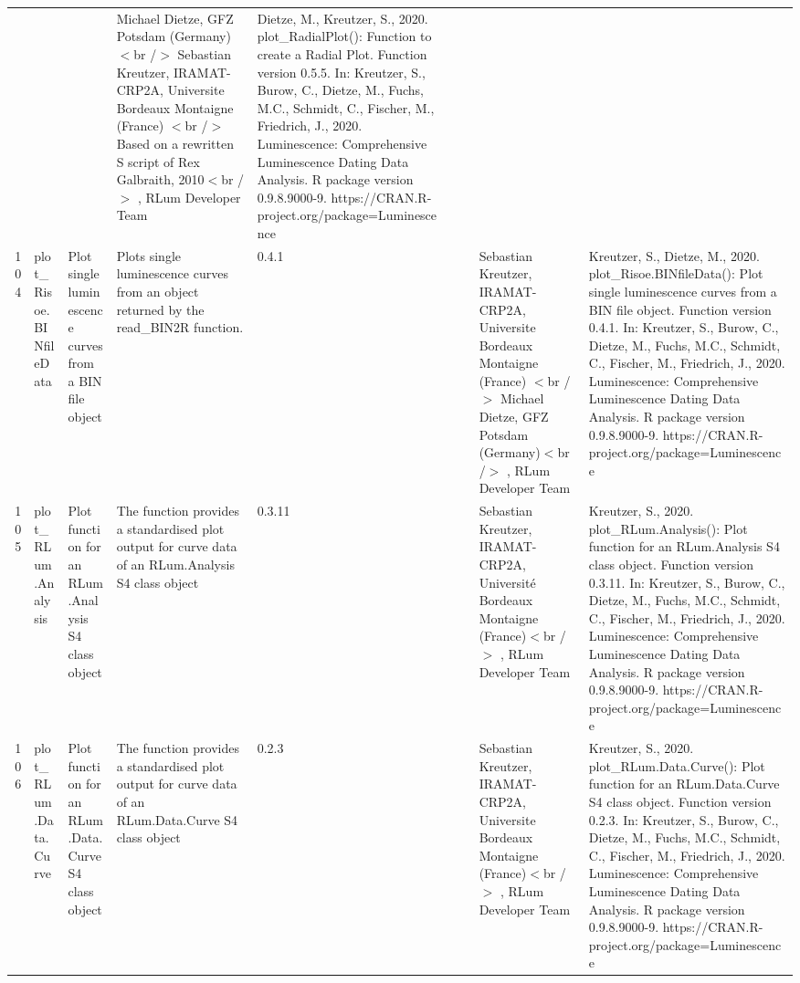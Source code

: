 \begin{table}[ht]
\begin{tabular}{rllllllll}
 &  &  & Michael Dietze, GFZ Potsdam (Germany) $<$br /$>$ Sebastian Kreutzer, IRAMAT-CRP2A, Universite Bordeaux Montaigne (France) $<$br /$>$ Based on a rewritten S script of Rex Galbraith, 2010$<$br /$>$ , RLum Developer Team & Dietze, M., Kreutzer, S., 2020. plot\_RadialPlot(): Function to create a Radial Plot. Function version 0.5.5. In: Kreutzer, S., Burow, C., Dietze, M., Fuchs, M.C., Schmidt, C., Fischer, M., Friedrich, J., 2020. Luminescence: Comprehensive Luminescence Dating Data Analysis. R package version 0.9.8.9000-9. https://CRAN.R-project.org/package=Luminescence
 \\ 
  104 & plot\_Risoe.BINfileData & Plot single luminescence curves from a BIN file object & Plots single luminescence curves from an object returned by the read\_BIN2R  function. & 0.4.1
 &  &  & Sebastian Kreutzer, IRAMAT-CRP2A, Universite Bordeaux Montaigne (France) $<$br /$>$ Michael Dietze, GFZ Potsdam (Germany)$<$br /$>$ , RLum Developer Team & Kreutzer, S., Dietze, M., 2020. plot\_Risoe.BINfileData(): Plot single luminescence curves from a BIN file object. Function version 0.4.1. In: Kreutzer, S., Burow, C., Dietze, M., Fuchs, M.C., Schmidt, C., Fischer, M., Friedrich, J., 2020. Luminescence: Comprehensive Luminescence Dating Data Analysis. R package version 0.9.8.9000-9. https://CRAN.R-project.org/package=Luminescence
 \\ 
  105 & plot\_RLum.Analysis & Plot function for an RLum.Analysis S4 class object & The function provides a standardised plot output for curve data of an RLum.Analysis S4 class object & 0.3.11
 &  &  & Sebastian Kreutzer, IRAMAT-CRP2A, Université Bordeaux Montaigne (France)$<$br /$>$ , RLum Developer Team & Kreutzer, S., 2020. plot\_RLum.Analysis(): Plot function for an RLum.Analysis S4 class object. Function version 0.3.11. In: Kreutzer, S., Burow, C., Dietze, M., Fuchs, M.C., Schmidt, C., Fischer, M., Friedrich, J., 2020. Luminescence: Comprehensive Luminescence Dating Data Analysis. R package version 0.9.8.9000-9. https://CRAN.R-project.org/package=Luminescence
 \\ 
  106 & plot\_RLum.Data.Curve & Plot function for an RLum.Data.Curve S4 class object & The function provides a standardised plot output for curve data of an RLum.Data.Curve S4 class object & 0.2.3
 &  &  & Sebastian Kreutzer, IRAMAT-CRP2A, Universite Bordeaux Montaigne (France)$<$br /$>$ , RLum Developer Team & Kreutzer, S., 2020. plot\_RLum.Data.Curve(): Plot function for an RLum.Data.Curve S4 class object. Function version 0.2.3. In: Kreutzer, S., Burow, C., Dietze, M., Fuchs, M.C., Schmidt, C., Fischer, M., Friedrich, J., 2020. Luminescence: Comprehensive Luminescence Dating Data Analysis. R package version 0.9.8.9000-9. https://CRAN.R-project.org/package=Luminescence

\end{tabular}
\end{table}
